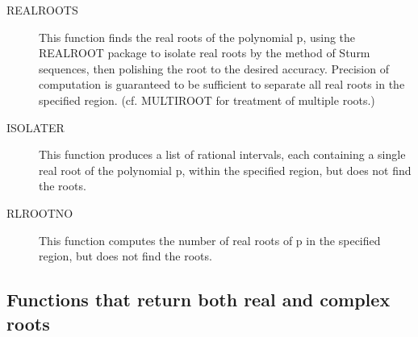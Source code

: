\begin{description}
 
\item[REALROOTS] This function finds the real roots of the polynomial p,
using the REALROOT package to isolate real roots by the method of Sturm
sequences, then polishing the root to the desired accuracy.  Precision
of computation is guaranteed to be sufficient to separate all real roots
in the specified region.  (cf. MULTIROOT for treatment of multiple
roots.)

\item[ISOLATER] This function produces a list of rational intervals, each
containing a single real root of the polynomial p, within the specified
region, but does not find the roots.

\item[RLROOTNO] This function computes the number of real roots of p in
the specified region, but does not find the roots.
\end{description}

\subsection{Functions that return both real and complex roots}

